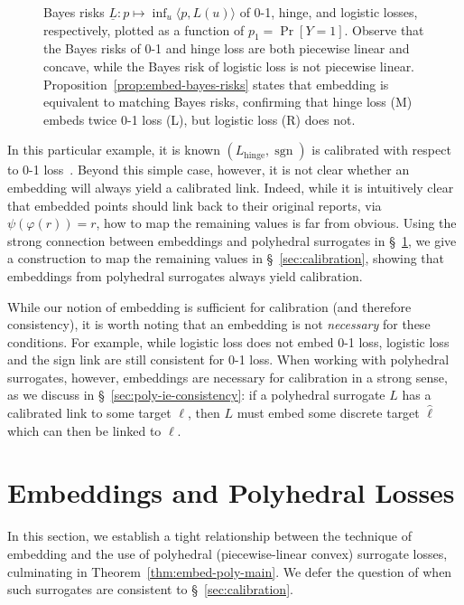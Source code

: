 \documentclass[twoside,11pt]{article}
\newcommand{\risk}[1]{\underline{#1}}
\newcommand{\inprod}[2]{\langle #1, #2 \rangle}%
\newcommand{\hinge}{L_{\mathrm{hinge}}}
\DeclareMathOperator*{\sgn}{sgn}
\begin{document}
\begin{figure}
\begin{minipage}{0.3\linewidth}
\end{minipage}
\caption{Bayes risks $\risk L : p \mapsto \inf_u \inprod{p}{L(u)}$ of 0-1, hinge, and logistic losses, respectively, plotted as a function of $p_1 = \Pr[Y=1]$.
	Observe that the Bayes risks of 0-1 and hinge loss are both piecewise linear and concave, while the Bayes risk of logistic loss is not piecewise linear.  Proposition~\ref{prop:embed-bayes-risks} states that embedding is equivalent to matching Bayes risks, confirming that hinge loss (M) embeds twice 0-1 loss (L), but logistic loss (R) does not.}
\label{fig:bayes-risks-01}
\end{figure}

In this particular example, it is known $(\hinge,\sgn)$ is calibrated with respect to 0-1 loss~\citep[Example 4]{bartlett2006convexity}.
Beyond this simple case, however, it is not clear whether an embedding will always yield a calibrated link.
Indeed, while it is intuitively clear that embedded points should link back to their original reports, via $\psi(\varphi(r)) = r$, how to map the remaining values is far from obvious.
Using the strong connection between embeddings and polyhedral surrogates in \S~\ref{sec:poly-loss-embed}, we give a construction to map the remaining values in \S~\ref{sec:calibration}, showing that embeddings from polyhedral surrogates always yield calibration.

While our notion of embedding is sufficient for calibration (and therefore consistency), it is worth noting that an embedding is not \emph{necessary} for these conditions.  
For example, while logistic loss does not embed 0-1 loss, logistic loss and the sign link are still consistent for 0-1 loss.
When working with polyhedral surrogates, however, embeddings are necessary for calibration in a strong sense, as we discuss in \S~\ref{sec:poly-ie-consistency}: if a polyhedral surrogate $L$ has a calibrated link to some target $\ell$, then $L$ must embed some discrete target $\hat\ell$ which can then be linked to $\ell$.



\section{Embeddings and Polyhedral Losses}
\label{sec:poly-loss-embed}

In this section, we establish a tight relationship between the technique of embedding and the use of polyhedral (piecewise-linear convex) surrogate losses, culminating in Theorem~\ref{thm:embed-poly-main}.
We defer the question of when such surrogates are consistent to \S~\ref{sec:calibration}. 
\end{document}
